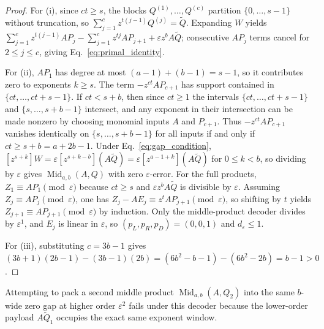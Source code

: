 \documentclass[11pt,a4paper]{article}
\theoremstyle{plain}
\theoremstyle{definition}
\theoremstyle{remark}
\DeclareMathOperator{\Mid}{Mid}
\begin{document}
\begin{proof}
For (i), since $ct \ge s$, the blocks $Q^{(1)}, \dots, Q^{(c)}$ partition $\{0, \dots, s - 1\}$ without truncation, so $\sum_{j=1}^c z^{t(j-1)} Q^{(j)} = \widetilde{Q}$. Expanding $W$ yields $\sum_{j=1}^c z^{t(j-1)} A P_j - \sum_{j=1}^c z^{tj} A P_{j+1} + \varepsilon z^b A \widetilde{Q}$; consecutive $A P_j$ terms cancel for $2 \le j \le c$, giving Eq.~\eqref{eq:primal_identity}.

For (ii), $A P_1$ has degree at most $(a - 1) + (b - 1) = s - 1$, so it contributes zero to exponents $k \ge s$. The term $-z^{ct} A P_{c+1}$ has support contained in $\{ct, \dots, ct + s - 1\}$. If $ct < s + b$, then since $ct \ge 1$ the intervals $\{ct, \dots, ct + s - 1\}$ and $\{s, \dots, s + b - 1\}$ intersect, and any exponent in their intersection can be made nonzero by choosing monomial inputs $A$ and $P_{c+1}$. Thus $-z^{ct} A P_{c+1}$ vanishes identically on $\{s, \dots, s + b - 1\}$ for all inputs if and only if $ct \ge s + b = a + 2b - 1$. Under Eq.~\eqref{eq:gap_condition}, $[z^{s+k}]W = \varepsilon [z^{s+k-b}](A\widetilde{Q}) = \varepsilon [z^{a-1+k}](A\widetilde{Q})$ for $0 \le k < b$, so dividing by $\varepsilon$ gives $\Mid_{a,b}(A, Q)$ with zero $\varepsilon$-error. For the full products, $Z_1 \equiv A P_1 \pmod{\varepsilon}$ because $ct \ge s$ and $\varepsilon z^b A\widetilde{Q}$ is divisible by $\varepsilon$. Assuming $Z_j \equiv A P_j \pmod{\varepsilon}$, one has $Z_j - A E_j \equiv z^t A P_{j+1} \pmod{\varepsilon}$, so shifting by $t$ yields $Z_{j+1} \equiv A P_{j+1} \pmod{\varepsilon}$ by induction. Only the middle-product decoder divides by $\varepsilon^1$, and $E_j$ is linear in $\varepsilon$, so $(p_L, p_R, p_D) = (0, 0, 1)$ and $d_\varepsilon \le 1$.

For (iii), substituting $c = 3b - 1$ gives $(3b + 1)(2b - 1) - (3b - 1)(2b) = (6b^2 - b - 1) - (6b^2 - 2b) = b - 1 > 0$.
\end{proof}

Attempting to pack a second middle product $\Mid_{a,b}(A, Q_2)$ into the same $b$-wide zero gap at higher order $\varepsilon^2$ fails under this decoder because the lower-order payload $A \widetilde{Q}_1$ occupies the exact same exponent window.
\end{document}
